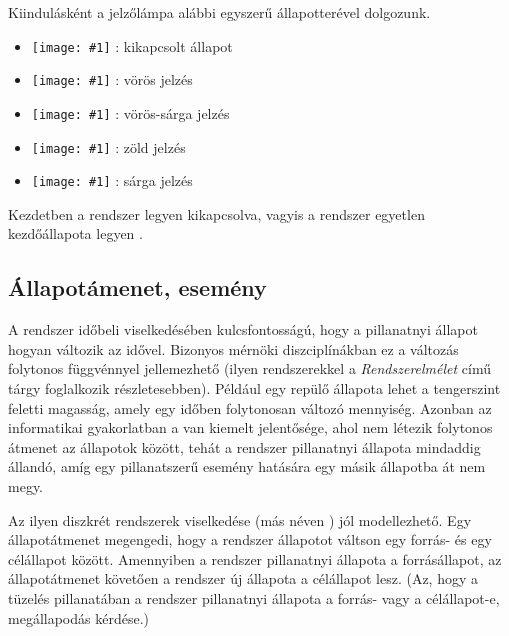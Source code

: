 \begin{megjegyzes}
Kiindulásként a jelzőlámpa alábbi egyszerű állapotterével dolgozunk.

\newcommand{\allapotikon}[1]{\texttt{[image: \#1]}}

\begin{itemize}
\item \allapotikon{tl_empty} : kikapcsolt állapot
\item \allapotikon{tl_red} : vörös jelzés
\item \allapotikon{tl_redyellow} : vörös-sárga jelzés
\item \allapotikon{tl_green} : zöld jelzés
\item \allapotikon{tl_yellow} : sárga jelzés
\end{itemize}

Kezdetben a rendszer legyen kikapcsolva, vagyis a rendszer egyetlen kezdőállapota legyen .
\end{megjegyzes}

\subsection{Állapotámenet, esemény}

A rendszer időbeli viselkedésében kulcsfontosságú, hogy a pillanatnyi állapot hogyan változik az idővel. Bizonyos mérnöki diszciplínákban ez a változás folytonos függvénnyel jellemezhető (ilyen rendszerekkel a \emph{Rendszerelmélet} című tárgy foglalkozik részletesebben). Például egy repülő állapota lehet a tengerszint feletti magasság, amely egy időben folytonosan változó mennyiség. Azonban az informatikai gyakorlatban a  van kiemelt jelentősége, ahol nem létezik folytonos átmenet az állapotok között, tehát a rendszer pillanatnyi állapota mindaddig állandó, amíg egy pillanatszerű esemény hatására egy másik állapotba át nem megy.

Az ilyen diszkrét rendszerek viselkedése  (más néven ) jól modellezhető. Egy állapotátmenet megengedi, hogy a rendszer állapotot váltson egy forrás- és egy célállapot között. Amennyiben a rendszer pillanatnyi állapota a forrásállapot, az állapotátmenet  követően a rendszer új állapota a célállapot lesz. (Az, hogy a tüzelés pillanatában a rendszer pillanatnyi állapota a forrás- vagy a célállapot-e, megállapodás kérdése.)

